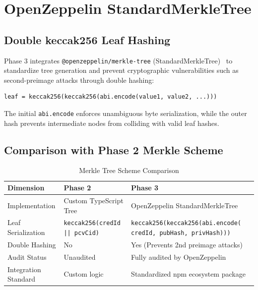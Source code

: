 \section{OpenZeppelin StandardMerkleTree}

\subsection{Double keccak256 Leaf Hashing}

Phase 3 integrates \texttt{@openzeppelin/merkle-tree} (StandardMerkleTree)~\cite{OZMerkleTree} to standardize tree generation and prevent cryptographic vulnerabilities such as second-preimage attacks through double hashing:

\begin{lstlisting}
leaf = keccak256(keccak256(abi.encode(value1, value2, ...)))
\end{lstlisting}

The initial \texttt{abi.encode} enforces unambiguous byte serialization, while the outer hash prevents intermediate nodes from colliding with valid leaf hashes.

\subsection{Comparison with Phase 2 Merkle Scheme}

\begin{table}[H]
\centering
\renewcommand{\arraystretch}{1.3}
\begin{tabular}{|p{4.2cm}|p{5.2cm}|p{5.2cm}|}
\hline
\textbf{Dimension} & \textbf{Phase 2} & \textbf{Phase 3} \\
\hline
Implementation & Custom TypeScript Tree & OpenZeppelin StandardMerkleTree \\
\hline
Leaf Serialization & \texttt{keccak256(credId || pcvCid)} & \texttt{keccak256(keccak256(abi.encode( credId, pubHash, privHash)))} \\
\hline
Double Hashing & No & Yes (Prevents 2nd preimage attacks) \\
\hline
Audit Status & Unaudited & Fully audited by OpenZeppelin \\
\hline
Integration Standard & Custom logic & Standardized npm ecosystem package \\
\hline
\end{tabular}
\caption{Merkle Tree Scheme Comparison}
\label{tab:merkle-comparison}
\end{table}